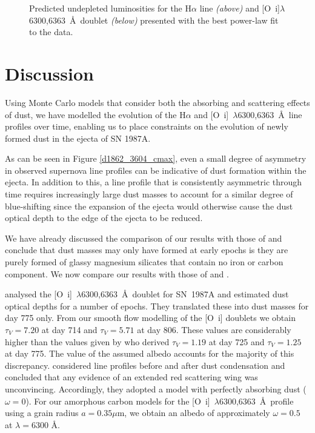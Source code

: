 \documentclass[useAMS,usenatbib,usegraphicx]{mnras}
\begin{document}
\begin{figure}
\caption{Predicted undepleted luminosities for the H$\alpha$ line \textit{(above)}  and [O~{\sc i}]$\lambda$6300,6363~\AA\ doublet \textit{(below)} presented with the best power-law fit to the data.}
\label{undep}

\end{figure}



\section{Discussion}
\label{discuss}

Using Monte Carlo 
models that consider both the absorbing and scattering effects of dust, we have modelled the evolution of the H$\alpha$ and 
[O~{\sc i}]~$\lambda$6300,6363~\AA\ line profiles over time, enabling us to  place constraints on the 
evolution of newly formed dust in the ejecta of SN 1987A.  

As can be seen in Figure \ref{d1862_3604_cmax}, even a small degree of asymmetry in observed supernova line profiles can be indicative of dust formation within the ejecta.  In addition to this, a line profile that is consistently asymmetric through time requires increasingly large dust masses to account for a similar degree of blue-shifting since the expansion of the ejecta would otherwise cause the dust optical depth to the edge of the ejecta to be reduced.

We have already discussed the comparison of our results with those of \citet{Dwek2015} and conclude that dust masses may only have formed at early epochs is they are purely formed of glassy magnesium silicates that contain no iron or carbon component.  We now compare our results with those of \citet{Lucy1989} and \citet{Wesson2015}.


\citet{Lucy1989} analysed the [O~{\sc i}]~$\lambda$6300,6363~\AA\ doublet for SN~1987A and estimated dust optical depths for a number of epochs. They translated these into dust masses for day 775 only.  
From our smooth flow modelling of the [O~{\sc i}] doublets we obtain $\tau_V=7.20$ at day 714 and $\tau_V=5.71$ at day 806.  These values are considerably higher than the values given by \citet{Lucy1989} who derived $\tau_V=1.19$ at day 725 and $\tau_V=1.25$ at day 775.  The value of the assumed albedo accounts for the majority of this discrepancy.  \citet{Lucy1989} considered line profiles before and after dust condensation and concluded that any evidence of an extended red scattering wing was unconvincing.  Accordingly, they adopted a model with perfectly absorbing dust ($\omega = 0$).  For our amorphous carbon models for the [O~{\sc i}]~$\lambda$6300,6363~\AA\ profile using a grain radius $a=0.35\mu$m, we obtain an albedo of approximately $\omega = 0.5$ at $\lambda=6300$ \AA.  
\end{document}
